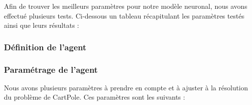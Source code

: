 \documentclass[10pt,a4paper]{article}
\begin{document}
Afin de trouver les meilleurs paramètres pour notre modèle neuronal, nous avons effectué plusieurs tests. Ci-dessous un tableau récapitulant les paramètres testés ainsi que leurs résultats :


\subsubsection{Définition de l'agent}

\subsubsection{Paramétrage de l'agent}
Nous avons plusieurs paramètres à prendre en compte et à ajuster à la résolution du problème de CartPole. Ces paramètres sont les suivants : 
\end{document}
